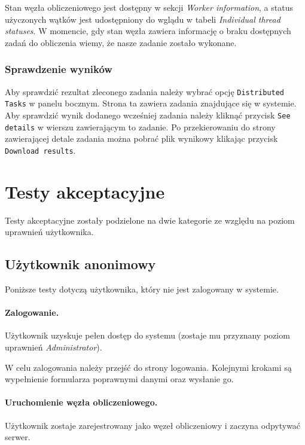 \documentclass[a4paper,11pt,twoside]{report}
\theoremstyle{definition}
\begin{document}
        
        Stan węzła obliczeniowego jest dostępny w sekcji \textit{Worker information}, a status użyczonych wątków jest udostępniony do wglądu w tabeli \textit{Individual thread statuses}. W momencie, gdy stan węzła zawiera informację o braku dostępnych zadań do obliczenia wiemy, że nasze zadanie zostało wykonane.
        
        
        \subsubsection{Sprawdzenie wyników}
        
        Aby sprawdzić rezultat zleconego zadania należy wybrać opcję \texttt{Distributed Tasks} w panelu bocznym.
        Strona ta zawiera zadania znajdujące się w systemie.
        Aby sprawdzić wynik dodanego wcześniej zadania należy kliknąć przycisk \texttt{See details} w wierszu zawierającym to zadanie.
        Po przekierowaniu do strony zawierającej detale zadania można pobrać plik wynikowy klikając przycisk \texttt{Download results}.

    
    \section{Testy akceptacyjne}
        
        Testy akceptacyjne zostały podzielone na dwie kategorie ze względu na poziom uprawnień użytkownika.
        
        \subsection{Użytkownik anonimowy}
            Poniższe testy dotyczą użytkownika, który nie jest zalogowany w systemie.
        
        
            \paragraph{Zalogowanie.} 
                \noindent Użytkownik uzyskuje pełen dostęp do systemu (zostaje mu przyznany poziom uprawnień \textit{Administrator}). 
            
                W celu zalogowania należy przejść do strony logowania. Kolejnymi krokami są wypełnienie formularza poprawnymi danymi oraz wysłanie go.
                
            \paragraph{Uruchomienie węzła obliczeniowego.} 
                \noindent Użytkownik zostaje zarejestrowany jako węzeł obliczeniowy i zaczyna odpytywać serwer.
                
\end{document}
